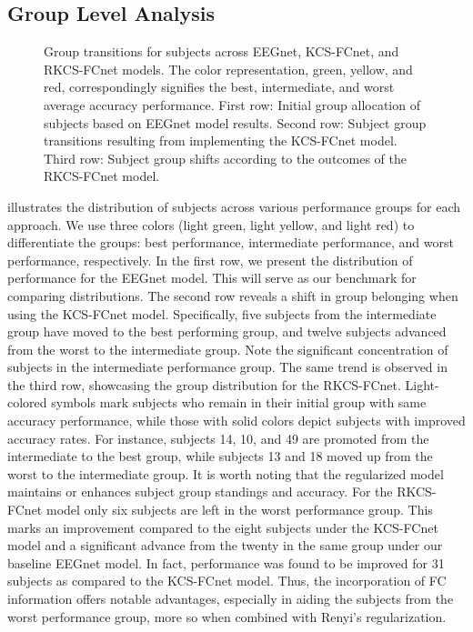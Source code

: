\subsection{Group Level Analysis}

\begin{figure}[!h]
  \centering
  \resizebox{\linewidth}{!}{}
  \caption{Group transitions for subjects across EEGnet, KCS-FCnet, and RKCS-FCnet models. The color representation, green, yellow, and red, correspondingly signifies the best, intermediate, and worst average accuracy performance. First row: Initial group allocation of subjects based on EEGnet model results. Second row: Subject group transitions resulting from implementing the KCS-FCnet model. Third row: Subject group shifts according to the outcomes of the RKCS-FCnet model.}\label{fig:belongcomp_obj3}
\end{figure}

 illustrates the distribution of subjects across various performance groups for each approach. We use three colors (light green, light yellow, and light red) to differentiate the groups: best performance, intermediate performance, and worst performance, respectively. In the first row, we present the distribution of performance for the EEGnet model. This will serve as our benchmark for comparing distributions. The second row reveals a shift in group belonging when using the KCS-FCnet model. Specifically, five subjects from the intermediate group have moved to the best performing group, and twelve subjects advanced from the worst to the intermediate group. Note the significant concentration of subjects in the intermediate performance group. The same trend is observed in the third row, showcasing the group distribution for the RKCS-FCnet. Light-colored symbols mark subjects who remain in their initial group with same accuracy performance, while those with solid colors depict subjects with improved accuracy rates. For instance, subjects 14, 10, and 49 are promoted from the intermediate to the best group, while subjects 13 and 18 moved up from the worst to the intermediate group. It is worth noting that the regularized model maintains or enhances subject group standings and accuracy. For the RKCS-FCnet model only six subjects are left in the worst performance group. This marks an improvement compared to the eight subjects under the KCS-FCnet model and a significant advance from the twenty in the same group under our baseline EEGnet model. In fact, performance was found to be improved for 31 subjects as compared to the KCS-FCnet model. Thus, the incorporation of FC information offers notable advantages, especially in aiding the subjects from the worst performance group, more so when combined with Renyi's regularization.

